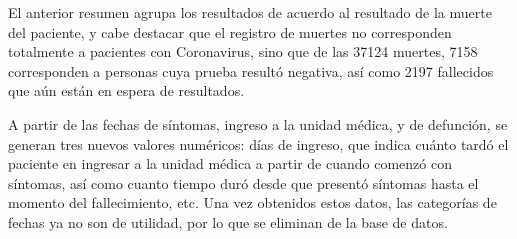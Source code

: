 \documentclass[]{article}
\begin{document}
El anterior resumen agrupa los resultados de acuerdo al resultado de la
muerte del paciente, y cabe destacar que el registro de muertes no
corresponden totalmente a pacientes con Coronavirus, sino que de las
37124 muertes, 7158 corresponden a personas cuya prueba resultó
negativa, así como 2197 fallecidos que aún están en espera de
resultados.

A partir de las fechas de síntomas, ingreso a la unidad médica, y de
defunción, se generan tres nuevos valores numéricos: días de ingreso,
que indica cuánto tardó el paciente en ingresar a la unidad médica a
partir de cuando comenzó con síntomas, así como cuanto tiempo duró desde
que presentó síntomas hasta el momento del fallecimiento, etc. Una vez
obtenidos estos datos, las categorías de fechas ya no son de utilidad,
por lo que se eliminan de la base de datos.
\end{document}
